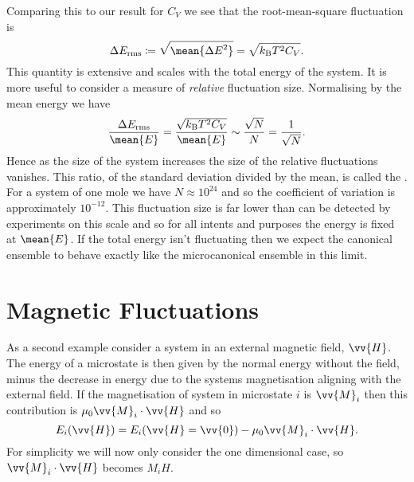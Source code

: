 \documentclass[fleqn]{NotesClass}
\newcommand*{\boltzmann}{k_{\mathrm{B}}}
\begin{document}
    Comparing this to our result for \(C_V\) we see that the root-mean-square fluctuation is
    \begin{equation}
        \Delta E_{\mathrm{rms}} \coloneqq \sqrt{\smash{\mean{\Delta E^2}}\rule{0ex}{2.2ex}} = \sqrt{\boltzmann T^2 C_V}.
    \end{equation}
    This quantity is extensive and scales with the total energy of the system.
    It is more useful to consider a measure of \emph{relative} fluctuation size.
    Normalising by the mean energy we have
    \begin{equation}
        \frac{\Delta E_{\mathrm{rms}}}{\mean{E}} = \frac{\sqrt{\boltzmann T^2C_V}}{\mean{E}} \sim \frac{\sqrt{N}}{N} = \frac{1}{\sqrt{N}}.
    \end{equation}
    Hence as the size of the system increases the size of the relative fluctuations vanishes.
    This ratio, of the standard deviation divided by the mean, is called the .
    For a system of one mole we have \(N \approx 10^{24}\) and so the coefficient of variation is approximately \(10^{-12}\).
    This fluctuation size is far lower than can be detected by experiments on this scale and so for all intents and purposes the energy is fixed at \(\mean{E}\).
    If the total energy isn't fluctuating then we expect the canonical ensemble to behave exactly like the microcanonical ensemble in this limit.
    
    \section{Magnetic Fluctuations}
    As a second example consider a system in an external magnetic field, \(\vv{H}\).
    The energy of a microstate is then given by the normal energy without the field, minus the decrease in energy due to the systems magnetisation aligning with the external field.
    If the magnetisation of system in microstate \(i\) is \(\vv{M}_i\) then this contribution is \(\mu_0\vv{M}_i \cdot \vv{H}\) and so
    \begin{equation}
        E_i(\vv{H}) = E_i(\vv{H} = \vv{0}) - \mu_0\vv{M}_i \cdot \vv{H}.
    \end{equation}
    For simplicity we will now only consider the one dimensional case, so \(\vv{M}_i\cdot\vv{H}\) becomes \(M_iH\).
    
\end{document}
